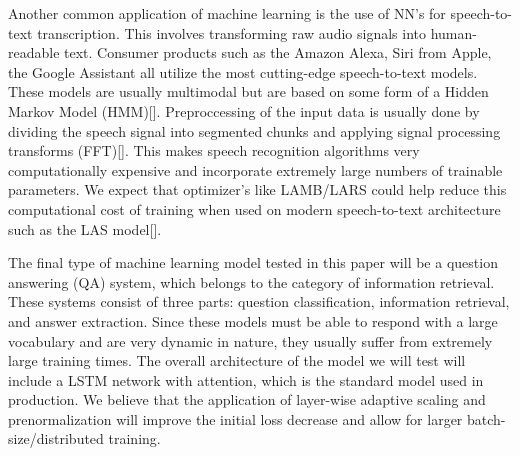 Another common application of machine learning is the use of NN's for speech-to-text transcription. This involves transforming raw audio signals into human-readable text. Consumer products such as the Amazon Alexa, Siri from Apple, the Google Assistant all utilize the most cutting-edge speech-to-text models. These models are usually multimodal but are based on some form of a Hidden Markov Model (HMM)[]. Preproccessing of the input data is usually done by dividing the speech signal into segmented chunks and applying signal processing transforms (FFT)[]. This makes speech recognition algorithms very computationally expensive and incorporate extremely large numbers of trainable parameters. We expect that optimizer's like LAMB/LARS could help reduce this computational cost of training when used on modern speech-to-text architecture such as the LAS model[].

The final type of machine learning model tested in this paper will be a question answering (QA) system, which belongs to the category of information retrieval. These systems consist of three parts: question classification, information retrieval, and answer extraction. Since these models  must be able to respond with a large vocabulary and are very dynamic in nature, they usually suffer from extremely large training times. The overall architecture of the model we will test will include a LSTM network with attention, which is the standard model used in production. We believe that the application of layer-wise adaptive scaling and prenormalization will improve the initial loss decrease and allow for larger batch-size/distributed training.\\






